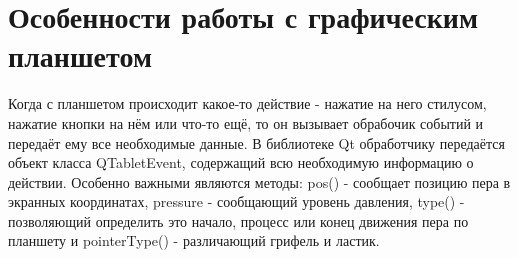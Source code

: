 \section{Особенности работы с графическим планшетом}
Когда с планшетом происходит какое-то действие - нажатие на него стилусом, нажатие кнопки на нём или что-то ещё, то он вызывает обрабочик событий и передаёт ему все необходимые данные. В библиотеке Qt обработчику передаётся объект класса QTabletEvent, содержащий всю необходимую информацию о действии. Особенно важными являются методы: pos() - сообщает позицию пера в экранных координатах, pressure - сообщающий уровень давления, type() - позволяющий определить это начало, процесс или конец движения пера по планшету и pointerType() - различающий грифель и ластик.
 
